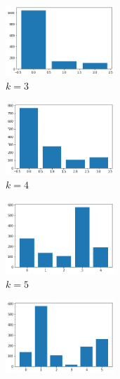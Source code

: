 \begin{figure}[H]
\begin{subfigure}{.5\textwidth}
  \centering
  \includegraphics[width=0.45\textwidth]{imagenes/counter/entrada/agg3.png}
  \caption{$k=3$}
\end{subfigure}%
\begin{subfigure}{.5\textwidth}
  \centering
  \includegraphics[width=0.45\textwidth]{imagenes/counter/entrada/agg4.png}
  \caption{$k=4$}
\end{subfigure}
\begin{subfigure}{.5\textwidth}
  \centering
  \includegraphics[width=0.45\textwidth]{imagenes/counter/entrada/agg5.png}
  \caption{$k=5$}
\end{subfigure}
\begin{subfigure}{.5\textwidth}
  \centering
  \includegraphics[width=0.45\textwidth]{imagenes/counter/entrada/agg6.png}

\end{subfigure}
\end{figure}
